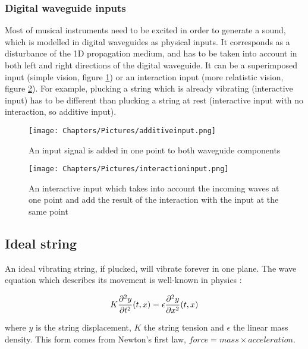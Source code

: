 \subsubsection*{Digital waveguide inputs}

Most of musical instruments need to be excited in order to generate a sound, which is modelled in digital waveguides as physical inputs. It corresponds as a disturbance of the 1D propagation medium, and has to be taken into account in both left and right directions of the digital waveguide. It can be a superimposed input (simple vision, figure \ref{fig:additiveinput}) or an interaction input (more relatistic vision, figure \ref{fig:interactioninput}). For example, plucking a string which is already vibrating (interactive input) has to be different than plucking a string at rest (interactive input with no interaction, so additive input).

\begin{figure}[h]
    \centering
    \texttt{[image: Chapters/Pictures/additiveinput.png]}
    \caption{An input signal is added in one point to both waveguide components}
    \label{fig:additiveinput}
\end{figure}

\begin{figure}[h]
    \centering
    \texttt{[image: Chapters/Pictures/interactioninput.png]}
    \caption{An interactive input which takes into account the incoming waves at one point and add the result of the interaction with the input at the same point}
    \label{fig:interactioninput}
\end{figure}

\subsection{Ideal string}

An ideal vibrating string, if plucked, will vibrate forever in one plane. The wave equation which describes its movement is well-known in physics :

\begin{equation*}
    \centering
    K \frac{\partial^{2} y}{\partial t^{2}}(t,x) = \epsilon \frac{\partial^{2} y}{\partial x^{2}}(t,x)
\end{equation*}

where $y$ is the string displacement, $K$ the string tension and $\epsilon$ the linear mass density.
This form comes from Newton's first law, $force = mass \times acceleration$.

